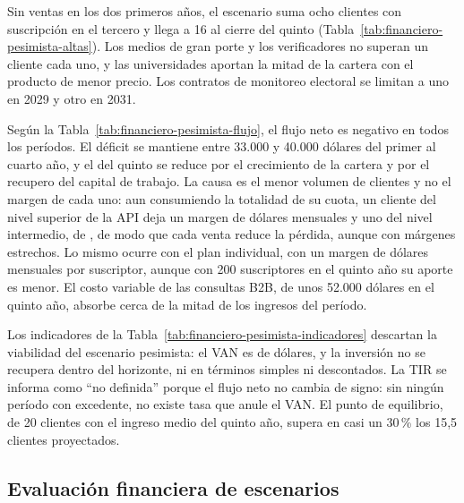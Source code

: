 Sin ventas en los dos primeros años, el escenario suma ocho clientes con suscripción en el tercero y llega a 16 al cierre del quinto (Tabla~\ref{tab:financiero-pesimista-altas}). Los medios de gran porte y los verificadores no superan un cliente cada uno, y las universidades aportan la mitad de la cartera con el producto de menor precio. Los contratos de monitoreo electoral se limitan a uno en 2029 y otro en 2031.



Según la Tabla~\ref{tab:financiero-pesimista-flujo}, el flujo neto es negativo en todos los períodos. El déficit se mantiene entre 33.000 y 40.000 dólares del primer al cuarto año, y el del quinto se reduce por el crecimiento de la cartera y por el recupero del capital de trabajo. La causa es el menor volumen de clientes y no el margen de cada uno: aun consumiendo la totalidad de su cuota, un cliente del nivel superior de la API deja un margen de \finMargenSuperiorPes{} dólares mensuales y uno del nivel intermedio, de \finMargenIntermediaPes{}, de modo que cada venta reduce la pérdida, aunque con márgenes estrechos. Lo mismo ocurre con el plan individual, con un margen de \finMargenIndividualPes{} dólares mensuales por suscriptor, aunque con 200 suscriptores en el quinto año su aporte es menor. El costo variable de las consultas B2B, de unos 52.000 dólares en el quinto año, absorbe cerca de la mitad de los ingresos del período.



Los indicadores de la Tabla~\ref{tab:financiero-pesimista-indicadores} descartan la viabilidad del escenario pesimista: el VAN es de \finPesVan{} dólares, y la inversión no se recupera dentro del horizonte, ni en términos simples ni descontados. La TIR se informa como \enquote{no definida} porque el flujo neto no cambia de signo: sin ningún período con excedente, no existe tasa que anule el VAN. El punto de equilibrio, de 20 clientes con el ingreso medio del quinto año, supera en casi un 30\,\% los 15,5 clientes proyectados.



\subsection{Evaluación financiera de escenarios}


